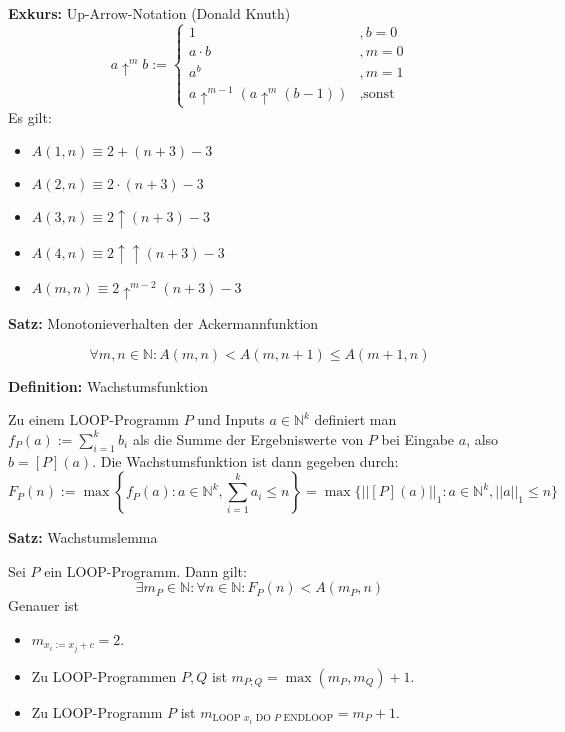 \documentclass[a4paper,graphics,11pt]{article}
\begin{document}
\textbf{Exkurs:} Up-Arrow-Notation (Donald Knuth)
$$
    a \uparrow^m b :=
    \begin{cases}
        1               &, b = 0\\
        a \cdot b       &, m = 0\\
        a^b             &, m = 1\\
        a \uparrow^{m-1}(a \uparrow^m(b-1)) &, \text{sonst}
    \end{cases}
$$
Es gilt:
\begin{itemize}
    \item $A(1,n) \equiv 2 + (n+3) - 3$
    \item $A(2,n) \equiv 2 \cdot (n+3) - 3$
    \item $A(3,n) \equiv 2 \uparrow (n+3) - 3$
    \item $A(4,n) \equiv 2 \uparrow\uparrow (n+3) - 3$
    \item $A(m,n) \equiv 2 \uparrow^{m-2} (n+3) - 3$
\end{itemize}

\newpage

\textbf{Satz:} Monotonieverhalten der Ackermannfunktion

$$
    \forall m,n \in \mathbb{N}: A(m,n) < A(m,n+1) \leq A(m+1,n)
$$

\strut

\textbf{Definition:} Wachstumsfunktion

Zu einem LOOP-Programm $P$ und Inputs $a \in \mathbb{N}^k$ definiert man
$
    f_P(a) := \sum_{i=1}^{k} b_i
$
als die Summe der Ergebniswerte von $P$ bei Eingabe $a$, also $b = [P](a)$.
Die Wachstumsfunktion ist dann gegeben durch:
$$
    F_P(n) := \max\left\{f_P(a) : a \in \mathbb{N}^k, \sum_{i=1}^{k} a_i \leq n\right\}
    = \max\{||[P](a)||_1 : a \in \mathbb{N}^k, ||a||_1 \leq n\}
$$

\strut

\textbf{Satz:} Wachstumslemma

Sei $P$ ein LOOP-Programm. Dann gilt:
$$
    \exists m_P \in \mathbb{N} : \forall n \in \mathbb{N} : F_P(n) < A(m_P,n)
$$
Genauer ist
\begin{itemize}
    \item $m_{x_i := x_j + c} = 2$.
    \item Zu LOOP-Programmen $P,Q$ ist $m_{P;Q} = \max(m_P,m_Q)+1$.
    \item Zu LOOP-Programm $P$ ist $m_{\text{LOOP } x_i \text{ DO } P \text{ ENDLOOP}} = m_P + 1$.
\end{itemize}
\end{document}
